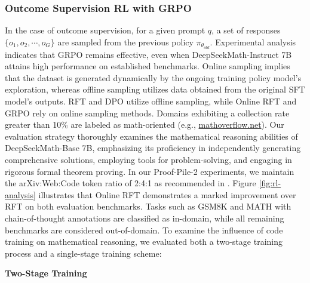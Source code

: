 \subsubsection{Outcome Supervision RL with GRPO} In the case of outcome supervision, for a given prompt $q$, a set of responses $\{o_1, o_2, \cdots, o_G\}$ are sampled from the previous policy $\pi_{\theta_{old}}$. Experimental analysis indicates that GRPO remains effective, even when DeepSeekMath-Instruct 7B attains high performance on established benchmarks. Online sampling implies that the dataset is generated dynamically by the ongoing training policy model’s exploration, whereas offline sampling utilizes data obtained from the original SFT model’s outputs. RFT and DPO utilize offline sampling, while Online RFT and GRPO rely on online sampling methods. Domains exhibiting a collection rate greater than 10\% are labeled as math-oriented (e.g., \url{mathoverflow.net}). Our evaluation strategy thoroughly examines the mathematical reasoning abilities of DeepSeekMath-Base 7B, emphasizing its proficiency in independently generating comprehensive solutions, employing tools for problem-solving, and engaging in rigorous formal theorem proving. In our Proof-Pile-2 experiments, we maintain the arXiv:Web:Code token ratio of 2:4:1 as recommended in \cite{llemma}. Figure \ref{fig:rl-analysis} illustrates that Online RFT demonstrates a marked improvement over RFT on both evaluation benchmarks. Tasks such as GSM8K and MATH with chain-of-thought annotations are classified as in-domain, while all remaining benchmarks are considered out-of-domain. To examine the influence of code training on mathematical reasoning, we evaluated both a two-stage training process and a single-stage training scheme:

\textbf{Two-Stage Training}

